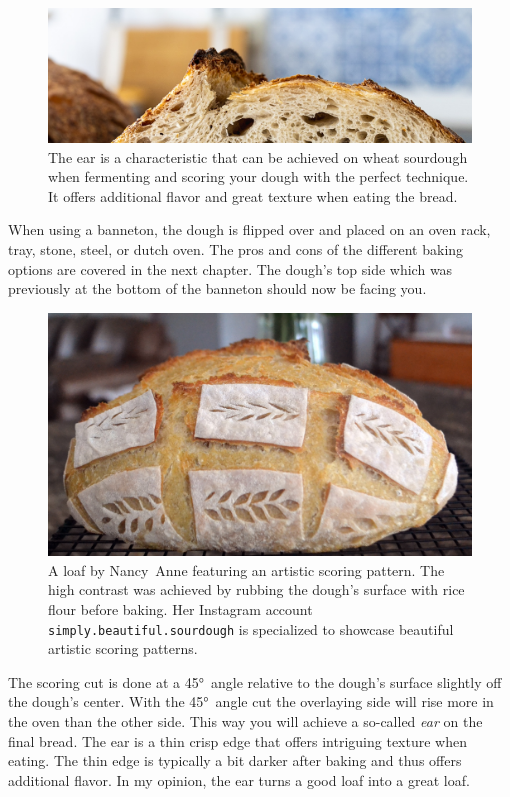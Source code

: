 \begin{figure}[htb!]
  \centering
  \includegraphics[width=\textwidth]{the-ear}
  \caption[Bread's ear]{The ear is a characteristic that can be achieved on
      wheat sourdough when fermenting and scoring your dough with the perfect
      technique. It offers additional flavor and great texture when eating the
      bread.}%
  \label{fig:the-ear}
\end{figure}

When using a banneton, the dough is flipped over and
placed on an oven rack, tray, stone, steel, or dutch oven. The pros
and cons of the different baking options are covered in the next chapter.
The dough's top side which was previously at the bottom of the
banneton should now be facing you.

\begin{figure}[htb!]
  \centering
  \includegraphics[width=\textwidth]{artistic-scoring}
  \caption[Artistic scoring]{A loaf by Nancy~Anne featuring an artistic
      scoring pattern.  The high contrast was achieved by rubbing the dough's
      surface with rice flour before baking. Her Instagram account
      \texttt{simply.beautiful.sourdough} is specialized to showcase beautiful
      artistic scoring patterns.}%
  \label{fig:artistic-scoring}
\end{figure}

The scoring cut is done at a \ang{45}~angle relative to the dough's
surface slightly off the dough's center. With the \ang{45}~angle cut
the overlaying side will rise more in the oven than the other side.
This way you will achieve a so-called \emph{ear} on the final bread.
The ear is a thin crisp edge that offers intriguing texture
when eating. The thin edge is typically a bit darker after baking
and thus offers additional flavor. In my opinion, the ear turns
a good loaf into a great loaf.

